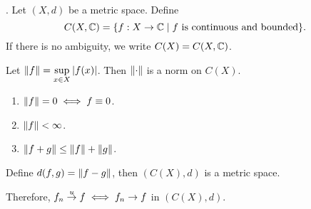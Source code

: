 . Let \((X, d)\) be a metric space. Define
\[
    C(X, \mathbb{C}) = \{f: X \rightarrow \mathbb{C} \mid f\text{ is continuous and bounded}\}.
\]
If there is no ambiguity, we write \(C(X) = C(X, \mathbb{C})\).

Let \(\left\lVert f \right\rVert = \displaystyle \sup_{x\in X} \left| f(x) \right|\). Then \(\left\lVert \cdot \right\rVert\) is a norm on \(C(X)\).
\begin{enumerate}
    \item \(\left\lVert f \right\rVert = 0 \iff f \equiv 0\).
    \item \(\left\lVert f \right\rVert < \infty\).
    \item \(\left\lVert f + g \right\rVert \leq \left\lVert f \right\rVert + \left\lVert g \right\rVert\).
\end{enumerate}
Define \(d(f, g) = \left\lVert f - g \right\rVert\), then \((C(X), d)\) is a metric space.

Therefore, \(f_n \overset{u}{\rightarrow} f \iff f_n \rightarrow f\) in \((C(X), d)\).

\pagebreak
